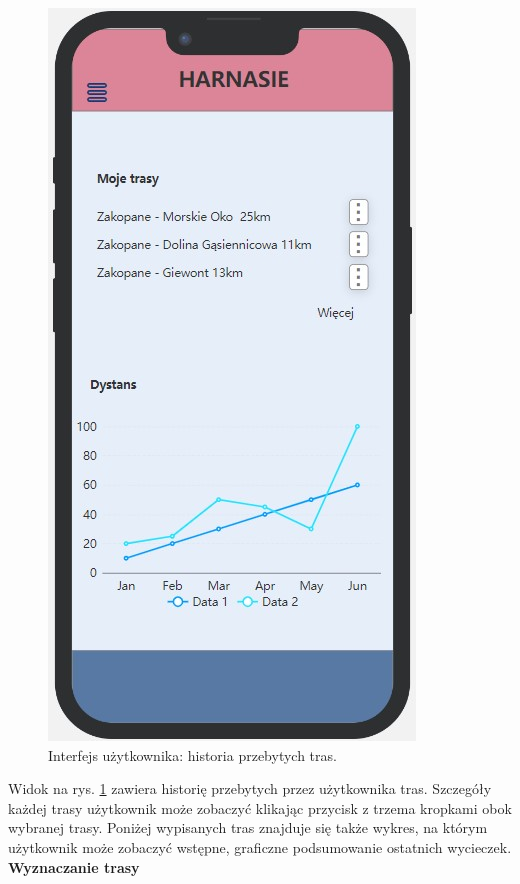     \begin{figure}[H]
        \centering
        \includegraphics[scale=0.5]{img/interfejsy/if_historia.jpg}
        \caption{Interfejs użytkownika: historia przebytych tras.}
        \label{interfejs:historia}
    \end{figure}
   Widok na rys. \ref{interfejs:historia} zawiera historię przebytych przez użytkownika tras. Szczegóły każdej trasy użytkownik może zobaczyć klikając przycisk z trzema kropkami obok wybranej trasy. Poniżej wypisanych tras znajduje się także wykres, na którym użytkownik może zobaczyć wstępne, graficzne podsumowanie ostatnich wycieczek. \\
   \textbf{Wyznaczanie trasy}
